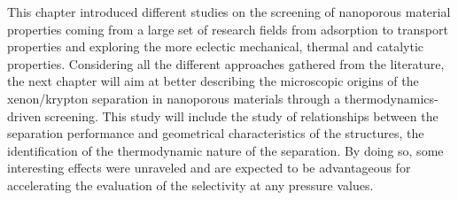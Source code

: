 \documentclass[main.tex]{subfiles}
\begin{document}
\begin{center}
\end{center}

This chapter introduced different studies on the screening of nanoporous material properties coming from a large set of research fields from adsorption to transport properties and exploring the more eclectic mechanical, thermal and catalytic properties. Considering all the different approaches gathered from the literature, the next chapter will aim at better describing the microscopic origins of the xenon/krypton separation in nanoporous materials through a thermodynamics-driven screening. This study will include the study of relationships between the separation performance and geometrical characteristics of the structures, the identification of the thermodynamic nature of the separation. By doing so, some interesting effects were unraveled and are expected to be advantageous for accelerating the evaluation of the selectivity at any pressure values.

\OnlyInSubfile{\printglobalbibliography}
\end{document}
